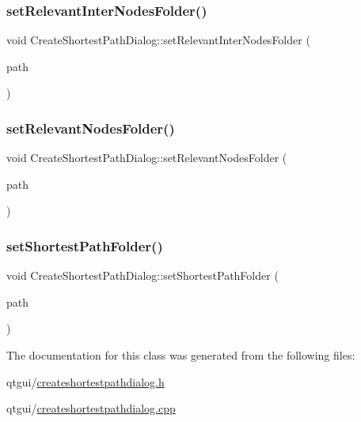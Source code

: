\subsubsection{\texorpdfstring{setRelevantInterNodesFolder()}{setRelevantInterNodesFolder()}}
{\footnotesize\ttfamily void Create\+Shortest\+Path\+Dialog\+::set\+Relevant\+Inter\+Nodes\+Folder (\begin{DoxyParamCaption}\item[{Q\+String}]{path }\end{DoxyParamCaption})}

\mbox{\label{class_create_shortest_path_dialog_a1ea2b0417bf537af0c22f9778382e24d}} 
\subsubsection{\texorpdfstring{setRelevantNodesFolder()}{setRelevantNodesFolder()}}
{\footnotesize\ttfamily void Create\+Shortest\+Path\+Dialog\+::set\+Relevant\+Nodes\+Folder (\begin{DoxyParamCaption}\item[{Q\+String}]{path }\end{DoxyParamCaption})}

\mbox{\label{class_create_shortest_path_dialog_a12534d02daec57940ade7608812e4b78}} 
\subsubsection{\texorpdfstring{setShortestPathFolder()}{setShortestPathFolder()}}
{\footnotesize\ttfamily void Create\+Shortest\+Path\+Dialog\+::set\+Shortest\+Path\+Folder (\begin{DoxyParamCaption}\item[{Q\+String}]{path }\end{DoxyParamCaption})}



The documentation for this class was generated from the following files\+:\begin{DoxyCompactItemize}
\item 
qtgui/\mbox{\hyperlink{createshortestpathdialog_8h}{createshortestpathdialog.\+h}}\item 
qtgui/\mbox{\hyperlink{createshortestpathdialog_8cpp}{createshortestpathdialog.\+cpp}}\end{DoxyCompactItemize}
